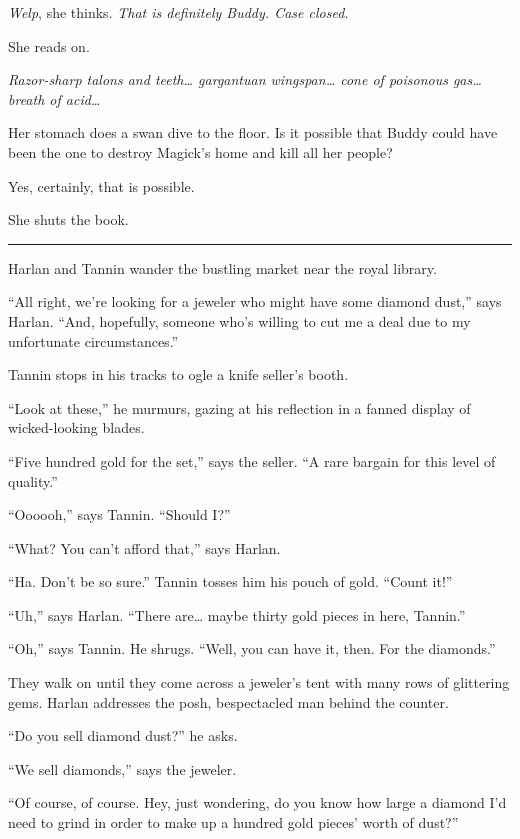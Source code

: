 \documentclass[smalldemyvopaper,11pt,twoside,onecolumn,openright,extrafontsizes]{memoir}
\begin{document}
\emph{Welp}, she thinks. \emph{That is definitely Buddy. Case closed.}

She reads on.

\emph{Razor-sharp talons and teeth\ldots{} gargantuan wingspan\ldots{}
cone of poisonous gas\ldots{} breath of acid\ldots{}}

Her stomach does a swan dive to the floor. Is it possible that Buddy
could have been the one to destroy Magick's home and kill all her
people?

Yes, certainly, that is possible.

She shuts the book.

\begin{center}\rule{0.5\linewidth}{\linethickness}\end{center}

Harlan and Tannin wander the bustling market near the royal library.

``All right, we're looking for a jeweler who might have some diamond
dust,'' says Harlan. ``And, hopefully, someone who's willing to cut me a
deal due to my unfortunate circumstances.''

Tannin stops in his tracks to ogle a knife seller's booth.

``Look at these,'' he murmurs, gazing at his reflection in a fanned
display of wicked-looking blades.

``Five hundred gold for the set,'' says the seller. ``A rare bargain for
this level of quality.''

``Oooooh,'' says Tannin. ``Should I?''

``What? You can't afford that,'' says Harlan.

``Ha. Don't be so sure.'' Tannin tosses him his pouch of gold. ``Count
it!''

``Uh,'' says Harlan. ``There are\ldots{} maybe thirty gold pieces in
here, Tannin.''

``Oh,'' says Tannin. He shrugs. ``Well, you can have it, then. For the
diamonds.''

They walk on until they come across a jeweler's tent with many rows of
glittering gems. Harlan addresses the posh, bespectacled man behind the
counter.

``Do you sell diamond dust?'' he asks.

``We sell diamonds,'' says the jeweler.

``Of course, of course. Hey, just wondering, do you know how large a
diamond I'd need to grind in order to make up a hundred gold pieces'
worth of dust?''
\end{document}
